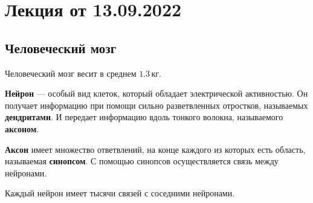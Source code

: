 
\section{Лекция от 13.09.2022}
\subsection{Человеческий мозг}
Человеческий мозг весит в среднем $1.3\,кг$.\par
\textbf{Нейрон} --- особый вид клеток, который обладает электрической
активностью. Он получает информацию при помощи сильно разветвленных отростков,
называемых \textbf{дендритами}. И передает информацию вдоль тонкого волокна,
называемого \textbf{аксоном}.\par
\textbf{Аксон} имеет множество ответвлений, на конце каждого из которых есть область,
называемая \textbf{синопсом}. С помощью синопсов осуществляется связь между
нейронами.\par
Каждый нейрон имеет тысячи связей с соседними нейронами.
